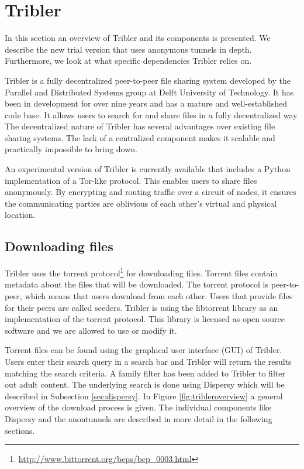 
\section{Tribler}
	\label{sec:tribler}
	In this section an overview of Tribler and its components is presented. We describe the new trial version that uses anonymous tunnels in depth. Furthermore, we look at what specific dependencies Tribler relies on.

	Tribler is a fully decentralized peer-to-peer file sharing system developed by the Parallel and Distributed Systems group at Delft University of Technology. It has been in development for over nine years and has a mature and well-established code base. It allows users to search for and share files in a fully decentralized way. The decentralized nature of Tribler has several advantages over existing file sharing systems. The lack of a centralized component makes it scalable and practically impossible to bring down. 

	An experimental version of Tribler is currently available that includes a Python implementation of a Tor-like protocol. This enables users to share files anonymously. By encrypting and routing traffic over a circuit of nodes, it ensures the communicating parties are oblivious of each other's virtual and physical location.
	
	\subsection{Downloading files}
		Tribler uses the torrent protocol\footnote{\url{http://www.bittorrent.org/beps/bep\_0003.html}} for downloading files. Torrent files contain metadata about the files that will be downloaded. The torrent protocol is peer-to-peer, which means that users download from each other. Users that provide files for their peers are called seeders. Tribler is using the libtorrent library as an implementation of the torrent protocol. This library is licensed as open source software and we are allowed to use or modify it.
		
		Torrent files can be found using the graphical user interface (GUI) of Tribler. Users enter their search query in a search bar and Tribler will return the results matching the search criteria. A family filter has been added to Tribler to filter out adult content. The underlying search is done using Dispersy which will be described in Subsection \ref{sec:dispersy}. In Figure \ref{fig:tribleroverview} a general overview of the download process is given. The individual components like Dispersy and the anontunnels are described in more detail in the following sections.
		
